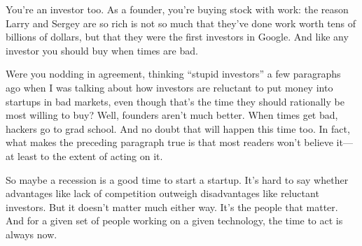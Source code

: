 You're an investor too. As a founder, you're buying stock with work: the
reason Larry and Sergey are so rich is not so much that they've done
work worth tens of billions of dollars, but that they were the first
investors in Google. And like any investor you should buy when times are
bad.

Were you nodding in agreement, thinking ``stupid investors'' a few
paragraphs ago when I was talking about how investors are reluctant to
put money into startups in bad markets, even though that's the time they
should rationally be most willing to buy? Well, founders aren't much
better. When times get bad, hackers go to grad school. And no doubt that
will happen this time too. In fact, what makes the preceding paragraph
true is that most readers won't believe it---at least to the extent of
acting on it.

So maybe a recession is a good time to start a startup. It's hard to say
whether advantages like lack of competition outweigh disadvantages like
reluctant investors. But it doesn't matter much either way. It's the
people that matter. And for a given set of people working on a given
technology, the time to act is always now.
